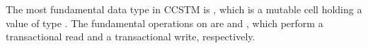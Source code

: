 The most fundamental data type in CCSTM is , which is a
mutable cell holding a value of type .  The fundamental
operations on  are  and , which perform
a transactional read and a transactional write, respectively.
